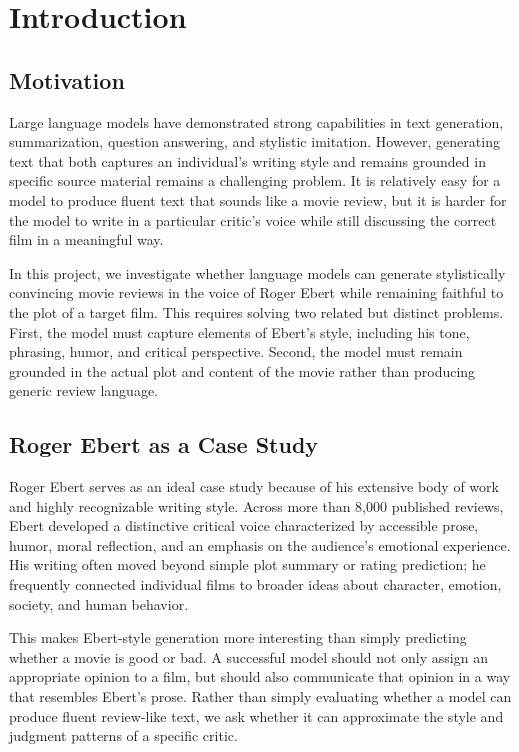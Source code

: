 \section{Introduction}

\subsection{Motivation}

Large language models have demonstrated strong capabilities in text generation, summarization, question answering, and stylistic imitation. However, generating text that both captures an individual's writing style and remains grounded in specific source material remains a challenging problem. It is relatively easy for a model to produce fluent text that sounds like a movie review, but it is harder for the model to write in a particular critic's voice while still discussing the correct film in a meaningful way.

In this project, we investigate whether language models can generate stylistically convincing movie reviews in the voice of Roger Ebert while remaining faithful to the plot of a target film. This requires solving two related but distinct problems. First, the model must capture elements of Ebert's style, including his tone, phrasing, humor, and critical perspective. Second, the model must remain grounded in the actual plot and content of the movie rather than producing generic review language.

\subsection{Roger Ebert as a Case Study}

Roger Ebert serves as an ideal case study because of his extensive body of work and highly recognizable writing style. Across more than 8,000 published reviews, Ebert developed a distinctive critical voice characterized by accessible prose, humor, moral reflection, and an emphasis on the audience's emotional experience. His writing often moved beyond simple plot summary or rating prediction; he frequently connected individual films to broader ideas about character, emotion, society, and human behavior.

This makes Ebert-style generation more interesting than simply predicting whether a movie is good or bad. A successful model should not only assign an appropriate opinion to a film, but should also communicate that opinion in a way that resembles Ebert's prose. Rather than simply evaluating whether a model can produce fluent review-like text, we ask whether it can approximate the style and judgment patterns of a specific critic.

